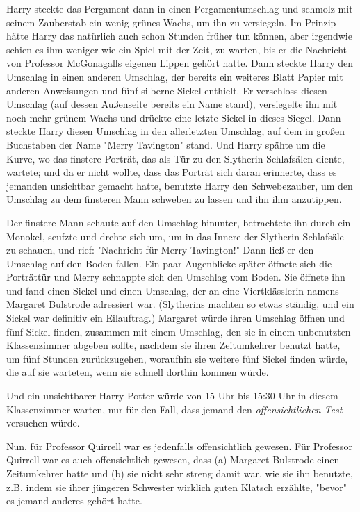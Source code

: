 {Harry steckte das Pergament dann in einen Pergamentumschlag und schmolz mit seinem Zauberstab ein wenig grünes Wachs, um ihn zu versiegeln. Im Prinzip hätte Harry das natürlich auch schon Stunden früher tun können, aber irgendwie schien es ihm weniger wie ein Spiel mit der Zeit, zu warten, bis er die Nachricht von Professor McGonagalls eigenen Lippen gehört hatte. Dann steckte Harry den Umschlag in einen anderen Umschlag, der bereits ein weiteres Blatt Papier mit anderen Anweisungen und fünf silberne Sickel enthielt. Er verschloss diesen Umschlag (auf dessen Außenseite bereits ein Name stand), versiegelte ihn mit noch mehr grünem Wachs und drückte eine letzte Sickel in dieses Siegel. Dann steckte Harry diesen Umschlag in den allerletzten Umschlag, auf dem in großen Buchstaben der Name "Merry Tavington" stand. Und Harry spähte um die Kurve, wo das finstere Porträt, das als Tür zu den Slytherin-Schlafsälen diente, wartete; und da er nicht wollte, dass das Porträt sich daran erinnerte, dass es jemanden unsichtbar gemacht hatte, benutzte Harry den Schwebezauber, um den Umschlag zu dem finsteren Mann schweben zu lassen und ihn ihm anzutippen.

Der finstere Mann schaute auf den Umschlag hinunter, betrachtete ihn durch ein Monokel, seufzte und drehte sich um, um in das Innere der Slytherin-Schlafsäle zu schauen, und rief: "Nachricht für Merry Tavington!" Dann ließ er den Umschlag auf den Boden fallen. Ein paar Augenblicke später öffnete sich die Porträttür und Merry schnappte sich den Umschlag vom Boden. Sie öffnete ihn und fand einen Sickel und einen Umschlag, der an eine Viertklässlerin namens Margaret Bulstrode adressiert war. (Slytherins machten so etwas ständig, und ein Sickel war definitiv ein Eilauftrag.) Margaret würde ihren Umschlag öffnen und fünf Sickel finden, zusammen mit einem Umschlag, den sie in einem unbenutzten Klassenzimmer abgeben sollte, nachdem sie ihren Zeitumkehrer benutzt hatte, um fünf Stunden zurückzugehen, woraufhin sie weitere fünf Sickel finden würde, die auf sie warteten, wenn sie schnell dorthin kommen würde.

Und ein unsichtbarer Harry Potter würde von 15 Uhr bis 15:30 Uhr in diesem Klassenzimmer warten, nur für den Fall, dass jemand den \emph{offensichtlichen Test} versuchen würde.

Nun, für Professor Quirrell war es jedenfalls offensichtlich gewesen. Für Professor Quirrell war es auch offensichtlich gewesen, dass (a) Margaret Bulstrode einen Zeitumkehrer hatte und (b) sie nicht sehr streng damit war, wie sie ihn benutzte, z.B. indem sie ihrer jüngeren Schwester wirklich guten Klatsch erzählte, "bevor" es jemand anderes gehört hatte.

}
